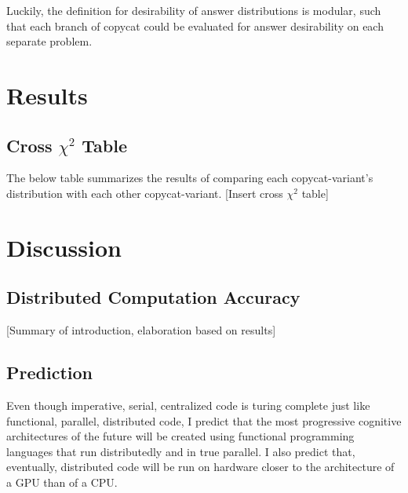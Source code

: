 \documentclass[a4paper]{article}
\begin{document}
        Luckily, the definition for desirability of answer distributions is modular, such that each branch of copycat could be evaluated for answer desirability on each separate problem.
       
\section{Results}

    \subsection{Cross $\chi^2$ Table}

        The below table summarizes the results of comparing each copycat-variant's distribution with each other copycat-variant.
        [Insert cross $\chi^2$ table]

\section{Discussion}

    \subsection{Distributed Computation Accuracy}

        [Summary of introduction, elaboration based on results]

    \subsection{Prediction}

        Even though imperative, serial, centralized code is turing complete just like functional, parallel, distributed code, I predict that the most progressive cognitive architectures of the future will be created using functional programming languages that run distributedly and in true parallel. 
        I also predict that, eventually, distributed code will be run on hardware closer to the architecture of a GPU than of a CPU.



\end{document}
